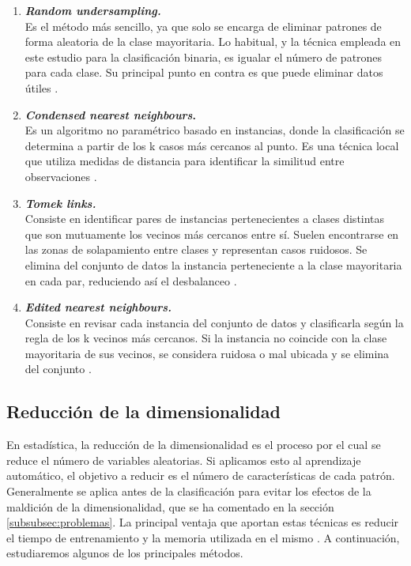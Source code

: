 \begin{enumerate}
	\item \textbf{\textit{Random undersampling.}} \\
		Es el método más sencillo, ya que solo se encarga de eliminar patrones de forma aleatoria de la clase mayoritaria. Lo habitual, y la técnica empleada en este estudio para la clasificación binaria, es igualar el número de patrones para cada clase. Su principal punto en contra es que puede eliminar datos útiles \cite{rundersampling}.
	\item \textbf{\textit{Condensed nearest neighbours}.} \\
		Es un algoritmo no paramétrico basado en instancias, donde la clasificación se determina a partir de los k casos más cercanos al punto. Es una técnica local que utiliza medidas de distancia para identificar la similitud entre observaciones \cite{cnn}.
	\item \textbf{\textit{Tomek links.}} \\
		Consiste en identificar pares de instancias pertenecientes a clases distintas que son mutuamente los vecinos más cercanos entre sí. Suelen encontrarse en las zonas de solapamiento entre clases y representan casos ruidosos. Se elimina del conjunto de datos la instancia perteneciente a la clase mayoritaria en cada par, reduciendo así el desbalanceo \cite{tomeklinks}.
	\item \textbf{\textit{Edited nearest neighbours.}} \\
		Consiste en revisar cada instancia del conjunto de datos y clasificarla según la regla de los k vecinos más cercanos. Si la instancia no coincide con la clase mayoritaria de sus vecinos, se considera ruidosa o mal ubicada y se elimina del conjunto \cite{enn}.
\end{enumerate}

\newpage
\subsection{Reducción de la dimensionalidad}
\label{subsec:red_dim}

En estadística, la reducción de la dimensionalidad es el proceso por el cual se reduce el número de variables aleatorias. Si aplicamos esto al aprendizaje automático, el objetivo a reducir es el número de características de cada patrón. Generalmente se aplica antes de la clasificación para evitar los efectos de la maldición de la dimensionalidad, que se ha comentado en la sección \ref{subsubsec:problemas}. La principal ventaja que aportan estas técnicas es reducir el tiempo de entrenamiento y la memoria utilizada en el mismo \cite{reddim}. A continuación, estudiaremos algunos de los principales métodos.

